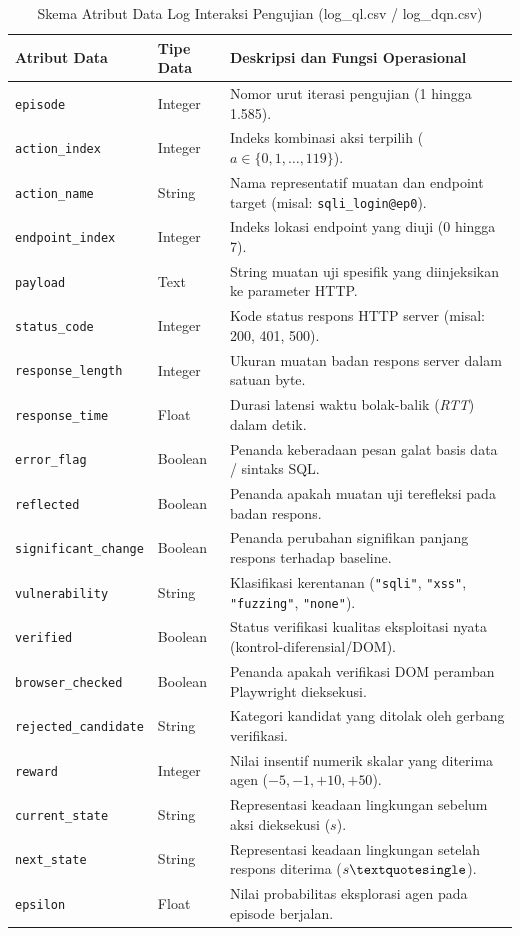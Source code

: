 \begin{table}[H]
\centering
\caption{Skema Atribut Data Log Interaksi Pengujian (log\_ql.csv / log\_dqn.csv)}
\label{tab:skema_log}
\begin{tabular}{|l|l|p{8.5cm}|}
\hline
\textbf{Atribut Data} & \textbf{Tipe Data} & \textbf{Deskripsi dan Fungsi Operasional} \\
\hline
\texttt{episode} & Integer & Nomor urut iterasi pengujian (1 hingga 1.585). \\
\texttt{action\_index} & Integer & Indeks kombinasi aksi terpilih ($a \in \{0, 1, \dots, 119\}$). \\
\texttt{action\_name} & String & Nama representatif muatan dan endpoint target (misal: \texttt{sqli\_login@ep0}). \\
\texttt{endpoint\_index} & Integer & Indeks lokasi endpoint yang diuji (0 hingga 7). \\
\texttt{payload} & Text & String muatan uji spesifik yang diinjeksikan ke parameter HTTP. \\
\texttt{status\_code} & Integer & Kode status respons HTTP server (misal: 200, 401, 500). \\
\texttt{response\_length} & Integer & Ukuran muatan badan respons server dalam satuan byte. \\
\texttt{response\_time} & Float & Durasi latensi waktu bolak-balik (\textit{RTT}) dalam detik. \\
\texttt{error\_flag} & Boolean & Penanda keberadaan pesan galat basis data / sintaks SQL. \\
\texttt{reflected} & Boolean & Penanda apakah muatan uji terefleksi pada badan respons. \\
\texttt{significant\_change} & Boolean & Penanda perubahan signifikan panjang respons terhadap baseline. \\
\texttt{vulnerability} & String & Klasifikasi kerentanan (\texttt{"sqli"}, \texttt{"xss"}, \texttt{"fuzzing"}, \texttt{"none"}). \\
\texttt{verified} & Boolean & Status verifikasi kualitas eksploitasi nyata (kontrol-diferensial/DOM). \\
\texttt{browser\_checked} & Boolean & Penanda apakah verifikasi DOM peramban Playwright dieksekusi. \\
\texttt{rejected\_candidate} & String & Kategori kandidat yang ditolak oleh gerbang verifikasi. \\
\texttt{reward} & Integer & Nilai insentif numerik skalar yang diterima agen ($-5, -1, +10, +50$). \\
\texttt{current\_state} & String & Representasi keadaan lingkungan sebelum aksi dieksekusi ($s$). \\
\texttt{next\_state} & String & Representasi keadaan lingkungan setelah respons diterima ($s\textquotesingle$). \\
\texttt{epsilon} & Float & Nilai probabilitas eksplorasi agen pada episode berjalan. \\
\hline
\end{tabular}
\end{table}

